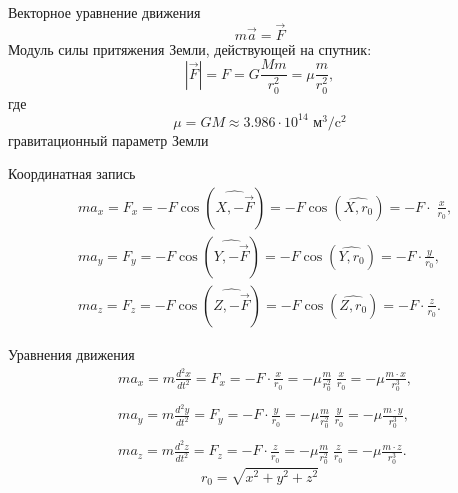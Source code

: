 \documentclass[11pt, compress]{beamer}
\begin{document}
\begin{frame}[fragile]{Векторное уравнение движения}
$$
  m \vec a = \vec F
$$
Модуль силы притяжения Земли, действующей на спутник:
$$
  |\vec F| = F = G \frac{M m}{r_0^2} = \mu \frac{m}{r_0^2}, 
$$ 
где
$$ 
\mu = G M \approx 3.986\cdot 10^{14} \text{ м}^3/\text{c}^2
$$ 
гравитационный параметр Земли
\end{frame}


\begin{frame}[fragile]{Координатная запись}
$$
\begin{aligned}
  & m a_x = F_x = - F \cos (\widehat{X,-\vec F}) = - F \cos (\widehat{X, r_0}) = - F \cdot{\;} \frac{x}{r_0}, \\
  & m a_y = F_y = - F \cos (\widehat{Y,-\vec F}) = - F \cos (\widehat{Y, r_0}) = - F \cdot \frac{y}{r_0}, \\
  & m a_z = F_z = - F \cos (\widehat{Z,-\vec F}) = - F \cos (\widehat{Z, r_0}) = - F \cdot \frac{z}{r_0}.
\end{aligned}
$$
\end{frame}

\begin{frame}[fragile]{Уравнения движения}
$$
\begin{aligned}
  & \boxed{m a_x} = m \frac{d^2 x}{dt^2} = F_x = - F \cdot \frac{x}{r_0} = - \mu \frac{m}{r_0^2} \; \frac{x}{r_0} = \boxed{- \mu \frac{m \cdot x}{r_0^3}}, \\
  & \\
  & \boxed{m a_y} = m \frac{d^2 y}{dt^2} = F_y = - F \cdot \frac{y}{r_0} = - \mu \frac{m}{r_0^2} \; \frac{y}{r_0} = \boxed{- \mu \frac{m \cdot y}{r_0^3}}, \\
  & \\
  & \boxed{m a_z} = m \frac{d^2 z}{dt^2} = F_z = - F \cdot \frac{z}{r_0} = - \mu \frac{m}{r_0^2} \; \frac{z}{r_0} = \boxed{- \mu \frac{m \cdot z}{r_0^3}}.
\end{aligned}
$$
$$
r_0 = \sqrt{x^2 + y^2 + z^2}
$$
\end{frame}

\end{document}

